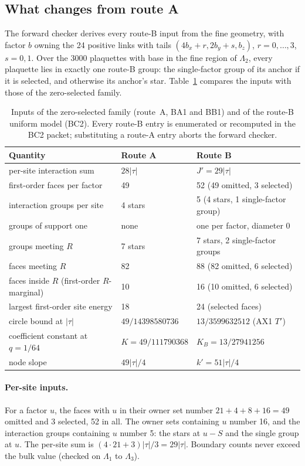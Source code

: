 \subsection{What changes from route A}
\label{sec:bc2-changes}
The forward checker derives every route-B input from the fine geometry, with
factor $b$ owning the 24 positive links with tails
$(4b_x+r,2b_y+s,b_z)$, $r=0,\ldots,3$, $s=0,1$. Over the 3000 plaquettes with
base in the fine region of $\Lambda_2$, every plaquette lies in exactly one
route-B group: the single-factor group of its anchor if it is selected, and
otherwise its anchor's star. Table~\ref{tab:bc2-changes} compares the inputs
with those of the zero-selected family.

\begin{table}[htbp]
\centering\small
\caption{Inputs of the zero-selected family (route~A, BA1 and BB1) and of the
route-B uniform model (BC2). Every route-B entry is enumerated or recomputed
in the BC2 packet; substituting a route-A entry aborts the forward checker.}
\label{tab:bc2-changes}
\begin{tabularx}{\linewidth}{@{}>{\raggedright\arraybackslash}X ll@{}}
\toprule
Quantity & Route A & Route B\\
\midrule
per-site interaction sum & $28|\tau|$ & $J'=29|\tau|$\\
first-order faces per factor & 49 & 52 (49 omitted, 3 selected)\\
interaction groups per site & 4 stars & 5 (4 stars, 1 single-factor group)\\
groups of support one & none & one per factor, diameter 0\\
groups meeting $R$ & 7 stars & 7 stars, 2 single-factor groups\\
faces meeting $R$ & 82 & 88 (82 omitted, 6 selected)\\
faces inside $R$ (first-order $R$-marginal) & 10 & 16 (10 omitted, 6 selected)\\
largest first-order site energy & 18 & 24 (selected faces)\\
circle bound at $|\tau|$ & $49/14398580736$ & $13/3599632512$ (AX1 $T'$)\\
coefficient constant at $q=1/64$ & $K=49/111790368$ & $K_B=13/27941256$\\
node slope & $49|\tau|/4$ & $k'=51|\tau|/4$\\
\bottomrule
\end{tabularx}
\end{table}

\paragraph{Per-site inputs.} For a factor $u$, the faces with $u$ in their
owner set number $21+4+8+16=49$ omitted and 3 selected, 52 in all. The owner
sets containing $u$ number 16, and the interaction groups containing $u$
number 5: the stars at $u-S$ and the single group at $u$. The per-site sum is
$(4\cdot21+3)|\tau|/3=29|\tau|$. Boundary counts never exceed the bulk value
(checked on $\Lambda_1$ to $\Lambda_3$).

